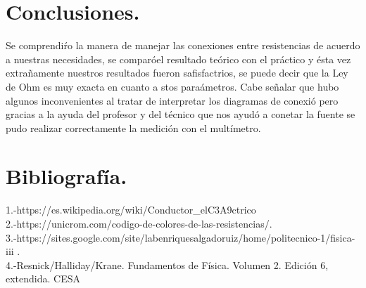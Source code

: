 \documentclass[11pt,a4paper]{article}
\begin{document}


\section{Conclusiones.}
Se comprendi\'r{o} la manera de manejar las conexiones entre resistencias de acuerdo a nuestras necesidades, se compar\'{o}el resultado te\'{o}rico con el pr\'{a}ctico y \'{e}sta vez extra\~{n}amente nuestros resultados fueron safisfactrios, se puede decir que la Ley de Ohm es muy exacta en cuanto a stos para\'{a}metros. Cabe se\~{n}alar que hubo algunos inconvenientes al tratar de interpretar los diagramas de conexi\'{o} pero gracias a la ayuda del profesor y del t\'{e}cnico que nos ayud\'{o} a conetar la fuente se pudo realizar correctamente la medici\'{o}n con el mult\'{i}metro. 
 \section{Bibliograf\'{i}a.}
1.-https://es.wikipedia.org/wiki/Conductor_elC3A9ctrico\\
2.-https://unicrom.com/codigo-de-colores-de-las-resistencias/.\\
3.-https://sites.google.com/site/labenriquesalgadoruiz/home/politecnico-1/fisica-iii .\\
4.-Resnick/Halliday/Krane. Fundamentos de F\'{i}sica. Volumen 2. Edici\'{o}n 6, extendida. CESA\\

\end{document}
